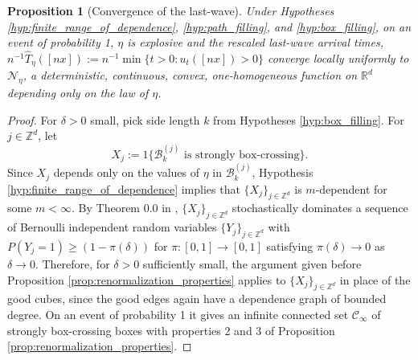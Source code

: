 \documentclass[aap]{imsart}
\newcommand{\R}{\mathbb{R}}
\newcommand{\Z}{\mathbb{Z}}
\newtheorem{prop}{Proposition}[section]
\begin{document}
\begin{prop}[Convergence of the last-wave] \label{prop:convergence_of_the_generalized_last_wave}
	Under Hypotheses \ref{hyp:finite_range_of_dependence}, \ref{hyp:path_filling}, and \ref{hyp:box_filling},
	on an event of probability 1, $\eta$ is explosive and the rescaled {\it last-wave} arrival times, $n^{-1} \hat{T}_{\eta}([nx]) := n^{-1} \min \{ t > 0 : u_t([nx]) > 0\}$ converge locally uniformly to $\mathcal{N}_{\eta}$, a deterministic, continuous, convex, one-homogeneous function on $\R^d$
	depending only on the law of $\eta$.
\end{prop}
\begin{proof}
	For $\delta > 0$ small, pick side length $k$ from Hypotheses \ref{hyp:box_filling}. 
	For $j \in \Z^d$, let 
	\[
	X_j := 1\{ \mathcal{B}^{(j)}_k  \mbox{ is strongly box-crossing} \}. 
	\]
	Since $X_j$ depends only on the values of $\eta$ in $\mathcal{B}^{(j)}_k$, Hypothesis \ref{hyp:finite_range_of_dependence} implies that $\{X_j\}_{j \in \Z^d}$ is $m$-dependent for some $m < \infty$.
	By Theorem 0.0 in \cite{liggett1997domination}, $\{X_j\}_{j \in \Z^d}$ stochastically dominates a sequence 
	of Bernoulli independent random variables $\{Y_j\}_{j \in \Z^d}$ with $P(Y_j = 1) \geq (1 - \pi(\delta))$ for $\pi:[0,1]\to[0,1]$
	satisfying $\pi(\delta) \to 0$ as $\delta \to 0$. Therefore, for $\delta > 0 $ sufficiently small, the argument given before Proposition \ref{prop:renormalization_properties} applies to $\{X_j\}_{j \in \Z^d}$ in place of the good cubes, since the good edges again have a dependence graph of bounded degree. On an event of probability 1 it gives an infinite connected set $\mathcal{C}_{\infty}$ of strongly box-crossing boxes with properties 2 and 3 of Proposition \ref{prop:renormalization_properties}. 
	

\end{proof}
\end{document}
